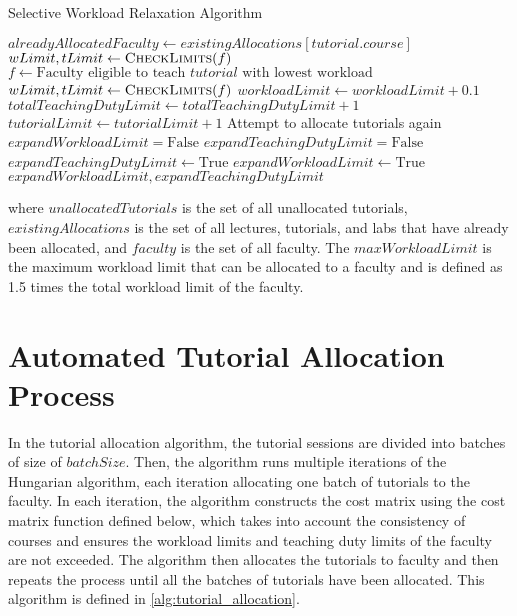 \begin{algorithm}[H]
  \caption*{Selective Workload Relaxation Algorithm}
  \begin{algorithmic}
    \State $alreadyAllocatedFaculty \gets existingAllocations[tutorial.course]$
    \State $wLimit, tLimit \gets \Call{CheckLimits}{f}$
    \EndFor
    \Else
    \State $f \gets \text{Faculty eligible to teach $tutorial$ with lowest workload}$
    \State $wLimit, tLimit \gets \Call{CheckLimits}{f}$
    \EndIf
    \EndFor
    \State $workloadLimit \gets workloadLimit + 0.1$
    \EndIf
    \State $totalTeachingDutyLimit \gets totalTeachingDutyLimit + 1$
    \State $tutorialLimit \gets tutorialLimit + 1$
    \EndIf
    \State Attempt to allocate tutorials again
    \EndWhile
    \EndProcedure
    \\
    \State $expandWorkloadLimit = \text{False}$
    \State $expandTeachingDutyLimit = \text{False}$
    \State $expandTeachingDutyLimit \gets \text{True}$
    \EndIf
    \State $expandWorkloadLimit \gets \text{True}$
    \EndIf
    \State \Return $expandWorkloadLimit, expandTeachingDutyLimit$
    \EndProcedure
  \end{algorithmic}
\end{algorithm}

where $unallocatedTutorials$ is the set of all unallocated tutorials, $existingAllocations$ is the set of all lectures, tutorials, and labs that have already been allocated, and $faculty$ is the set of all faculty. The $maxWorkloadLimit$ is the maximum workload limit that can be allocated to a faculty and is defined as 1.5 times the total workload limit of the faculty.

\section{Automated Tutorial Allocation Process}

In the tutorial allocation algorithm, the tutorial sessions are divided into batches of size of $batchSize$. Then, the algorithm runs multiple iterations of the Hungarian algorithm, each iteration allocating one batch of tutorials to the faculty. In each iteration, the algorithm constructs the cost matrix using the cost matrix function defined below, which takes into account the consistency of courses and ensures the workload limits and teaching duty limits of the faculty are not exceeded. The algorithm then allocates the tutorials to faculty and then repeats the process until all the batches of tutorials have been allocated. This algorithm is defined in \autoref{alg:tutorial_allocation}.

